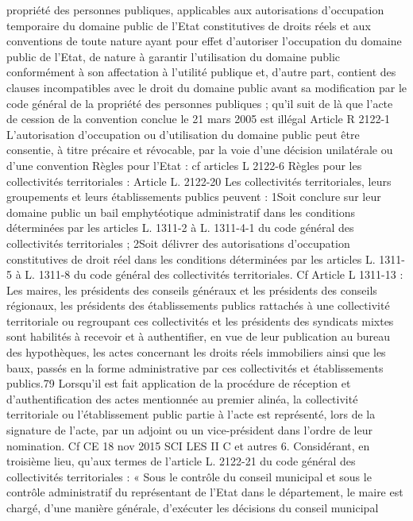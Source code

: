 \documentclass[11pt,a4paper]{report}
\begin{document}
propriété des personnes publiques, applicables aux autorisations d'occupation temporaire du domaine public de
l'Etat constitutives de droits réels et aux conventions de toute nature ayant pour effet d'autoriser l'occupation du
domaine public de l'Etat, de nature à garantir l'utilisation du domaine public conformément à son affectation à
l'utilité publique et, d'autre part, contient des clauses incompatibles avec le droit du domaine public avant sa
modification par le code général de la propriété des personnes publiques ; qu'il suit de là que l'acte de cession
de la convention conclue le 21 mars 2005 est illégal
Article R 2122-1 L'autorisation d'occupation ou d'utilisation du domaine public peut être consentie, à titre
précaire et révocable, par la voie d'une décision unilatérale ou d'une convention
Règles pour l’Etat : cf articles L 2122-6
Règles pour les collectivités territoriales : Article L. 2122-20
Les collectivités territoriales, leurs groupements et leurs établissements publics peuvent :
1\degre  Soit conclure sur leur domaine public un bail emphytéotique administratif dans les conditions déterminées
par les articles L. 1311-2 à L. 1311-4-1 du code général des collectivités territoriales ;
2\degre  Soit délivrer des autorisations d'occupation constitutives de droit réel dans les conditions déterminées par les
articles L. 1311-5 à L. 1311-8 du code général des collectivités territoriales.
Cf Article L 1311-13 : Les maires, les présidents des conseils généraux et les présidents des conseils régionaux,
les présidents des établissements publics rattachés à une collectivité territoriale ou regroupant ces collectivités
et les présidents des syndicats mixtes sont habilités à recevoir et à authentifier, en vue de leur publication au
bureau des hypothèques, les actes concernant les droits réels immobiliers ainsi que les baux, passés en la forme
administrative par ces collectivités et établissements publics.79
Lorsqu'il est fait application de la procédure de réception et d'authentification des actes mentionnée au premier
alinéa, la collectivité territoriale ou l'établissement public partie à l'acte est représenté, lors de la signature de
l'acte, par un adjoint ou un vice-président dans l'ordre de leur nomination.
Cf CE 18 nov 2015  SCI LES II C et autres
6. Considérant, en troisième lieu, qu’aux termes de l’article L. 2122-21 du code général des collectivités
territoriales : « Sous le contrôle du conseil municipal et sous le contrôle administratif du représentant de l’Etat
dans le département, le maire est chargé, d’une manière générale, d’exécuter les décisions du conseil municipal
\end{document}
